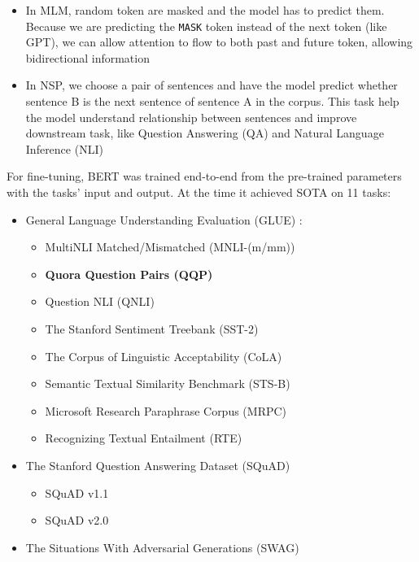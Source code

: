 \begin{itemize}
    \item In MLM, random token are masked and the model has to predict them. Because we are predicting the \texttt{MASK} token instead of the next token (like GPT), we can allow  attention to flow to both past and future token, allowing bidirectional information
    \item In NSP, we choose a pair of sentences and have the model predict whether sentence B is the next sentence of sentence A in the corpus. This task help the model understand relationship between sentences and improve downstream task, like Question Answering (QA) and Natural Language Inference (NLI)
\end{itemize}

For fine-tuning, BERT was trained end-to-end from the pre-trained parameters with the tasks' input and output. At the time it achieved SOTA on 11 tasks:

\begin{itemize}
    \item {General Language Understanding Evaluation (GLUE) \cite{glue-benchmark}:}
          \begin{itemize}
              \item MultiNLI Matched/Mismatched (MNLI-(m/mm))
              \item \textbf{Quora Question Pairs (QQP)}
              \item Question NLI (QNLI)
              \item The Stanford Sentiment Treebank (SST-2)
              \item The Corpus of Linguistic Acceptability (CoLA)
              \item Semantic Textual Similarity Benchmark (STS-B)
              \item Microsoft Research Paraphrase Corpus (MRPC)
              \item Recognizing Textual Entailment (RTE)
          \end{itemize}
    \item The Stanford Question Answering Dataset (SQuAD)
          \begin{itemize}
              \item SQuAD  v1.1
              \item SQuAD v2.0
          \end{itemize}
    \item The Situations With Adversarial Generations (SWAG)
\end{itemize}

